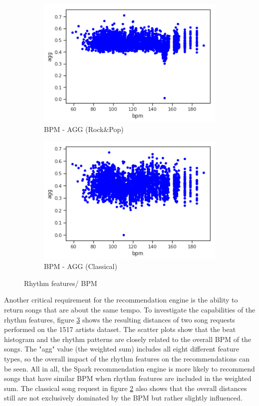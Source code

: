 \begin{figure}[htbp]
{{			\begin{subfigure}{.495\textwidth}
				\centering			
				\includegraphics[scale=0.5]{Images/SparkFeat/bpm_agg_hip.png}	
				\caption{BPM - AGG (Rock\&Pop)}
				\label{fig:arbpm}
			\end{subfigure}		
			\begin{subfigure}{.495\textwidth}
				\centering			
				\includegraphics[scale=0.5]{Images/SparkFeat/bpm_agg_clas.png}	
				\caption{BPM - AGG (Classical)}
				\label{fig:acbpm}
			\end{subfigure}%
	}}
	\caption{Rhythm features/ BPM}
	\label{fig:rhythmfeat}
\end{figure}
\FloatBarrier

\noindent Another critical requirement for the recommendation engine is the ability to return songs that are about the same tempo. To investigate the capabilities of the rhythm features, figure \ref{fig:rhythmfeat} shows the resulting distances of two song requests performed on the 1517 artists dataset.
\noindent The scatter plots show that the beat histogram and the rhythm patterns are closely related to the overall BPM of the songs. The "agg" value (the weighted sum) includes all eight different feature types, so the overall impact of the rhythm features on the recommendations can be seen. All in all, the Spark recommendation engine is more likely to recommend songs that have similar BPM when rhythm features are included in the weighted sum. The classical song request in figure \ref{fig:acbpm} also shows that the overall distances still are not exclusively dominated by the BPM but rather slightly influenced. 


